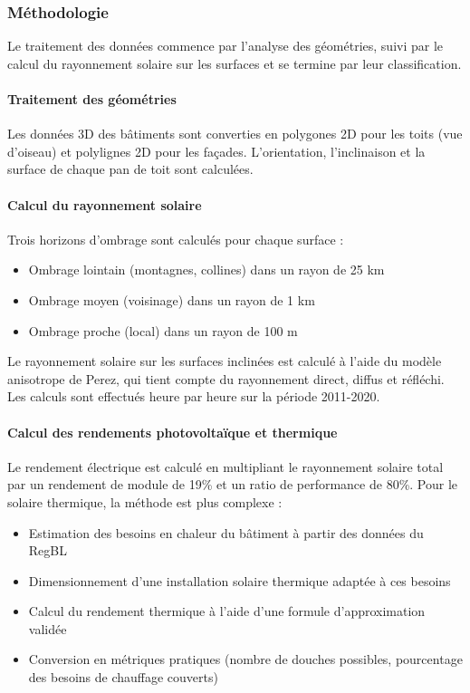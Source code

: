 {\subsubsection{Méthodologie}
\par{Le traitement des données commence par l'analyse des géométries, suivi par le calcul du rayonnement solaire sur les surfaces et se termine par leur classification.}

\paragraph{Traitement des géométries}
\par{Les données 3D des bâtiments sont converties en polygones 2D pour les toits (vue d'oiseau) et polylignes 2D pour les façades. L'orientation, l'inclinaison et la surface de chaque pan de toit sont calculées.}

\paragraph{Calcul du rayonnement solaire}
Trois horizons d'ombrage sont calculés pour chaque surface :
\begin{itemize}
    \item Ombrage lointain (montagnes, collines) dans un rayon de 25 km
    \item Ombrage moyen (voisinage) dans un rayon de 1 km
    \item Ombrage proche (local) dans un rayon de 100 m
\end{itemize}
\par{Le rayonnement solaire sur les surfaces inclinées est calculé à l'aide du modèle anisotrope de Perez, qui tient compte du rayonnement direct, diffus et réfléchi. Les calculs sont effectués heure par heure sur la période 2011-2020.}

\paragraph{Calcul des rendements photovoltaïque et thermique}
\par{Le rendement électrique est calculé en multipliant le rayonnement solaire total par un rendement de module de 19\% et un ratio de performance de 80\%. Pour le solaire thermique, la méthode est plus complexe :}
\begin{itemize}
    \item Estimation des besoins en chaleur du bâtiment à partir des données du RegBL
    \item Dimensionnement d'une installation solaire thermique adaptée à ces besoins
    \item Calcul du rendement thermique à l'aide d'une formule d'approximation validée
    \item Conversion en métriques pratiques (nombre de douches possibles, pourcentage des besoins de chauffage couverts)
\end{itemize}

}
